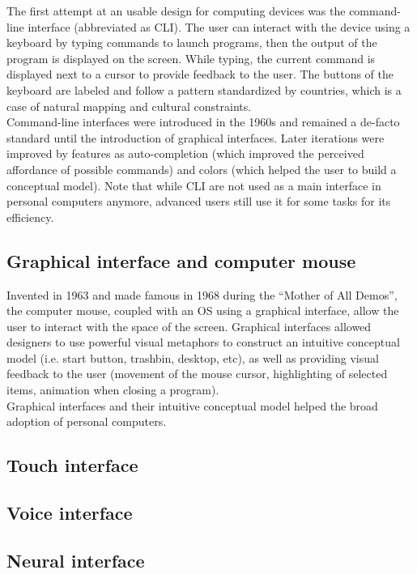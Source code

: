 \documentclass[a4paper,11pt] {article}
\theoremstyle{definition}
\begin{document}
    The first attempt at an usable design for computing devices was the command-line interface (abbreviated as CLI). The user can interact with the device using a keyboard by typing commands to launch programs, then the output of the program is displayed on the screen. While typing, the current command is displayed next to a cursor to provide feedback to the user. The buttons of the keyboard are labeled and follow a pattern standardized by countries, which is a case of natural mapping and cultural constraints.\\

    Command-line interfaces were introduced in the 1960s and remained a de-facto standard until the introduction of graphical interfaces. Later iterations were improved by features as auto-completion (which improved the perceived affordance of possible commands) and colors (which helped the user to build a conceptual model). Note that while CLI are not used as a main interface in personal computers anymore, advanced users still use it for some tasks for its efficiency.

    \subsection{Graphical interface and computer mouse}

    Invented in 1963 and made famous in 1968 during the ``Mother of All Demos''\cite{engelbart1968research}, the computer mouse, coupled with an OS using a graphical interface, allow the user to interact with the space of the screen. Graphical interfaces allowed designers to use powerful visual metaphors to construct an intuitive conceptual model (i.e. start button, trashbin, desktop, etc), as well as providing visual feedback to the user (movement of the mouse cursor, highlighting of selected items, animation when closing a program).\\

    Graphical interfaces and their intuitive conceptual model helped the broad adoption of personal computers.

    \subsection{Touch interface}
    \subsection{Voice interface}
    \subsection{Neural interface}
\end{document}
